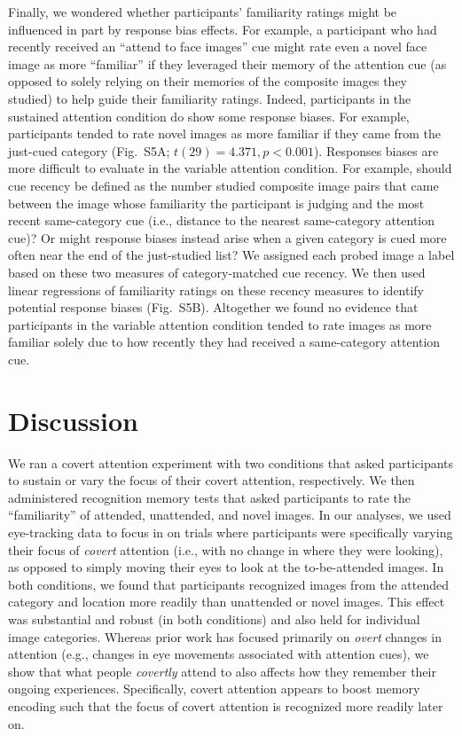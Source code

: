 \documentclass[english]{article}
\newcommand{\responseBias}{S5}
\begin{document}
Finally, we wondered whether participants' familiarity ratings might be
influenced in part by response bias effects. For example, a participant who had
recently received an ``attend to face images'' cue might rate even a novel face
image as more ``familiar'' if they leveraged their memory of the attention cue
(as opposed to solely relying on their memories of the composite images they
studied) to help guide their familiarity ratings. Indeed, participants in the
sustained attention condition do show some response biases. For example,
participants tended to rate novel images as more familiar if they came from the
just-cued category (Fig.~\responseBias A; $t(29) = 4.371, p < 0.001$).
Responses biases are more difficult to evaluate in the variable attention
condition. For example, should cue recency be defined as the number studied
composite image pairs that came between the image whose familiarity the
participant is judging and the most recent same-category cue (i.e., distance to
the nearest same-category attention cue)? Or might response biases instead
arise when a given category is cued more often near the end of the just-studied
list? We assigned each probed image a label based on these two measures of
category-matched cue recency. We then used linear regressions of familiarity
ratings on these recency measures to identify potential response biases
(Fig.~\responseBias B). Altogether we found no evidence that participants in
the variable attention condition tended to rate images as more familiar solely
due to how recently they had received a same-category attention cue.

\section*{Discussion}

We ran a covert attention experiment with two conditions that asked
participants to sustain or vary the focus of their covert attention,
respectively. We then administered recognition memory tests that asked
participants to rate the ``familiarity'' of attended, unattended, and novel
images. In our analyses, we used eye-tracking data to focus in on trials where
participants were specifically varying their focus of \textit{covert} attention
(i.e., with no change in where they were looking), as opposed to simply moving
their eyes to look at the to-be-attended images. In both conditions, we found
that participants recognized images from the attended category and location
more readily than unattended or novel images. This effect was substantial and
robust (in both conditions) and also held for individual image categories.
Whereas prior work has focused primarily on \textit{overt} changes in attention
(e.g., changes in eye movements associated with attention cues), we show that
what people \textit{covertly} attend to also affects how they remember their
ongoing experiences. Specifically, covert attention appears to boost memory
encoding such that the focus of covert attention is recognized more readily
later on.
\end{document}
